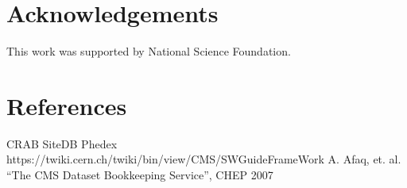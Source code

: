 \documentclass[a4paper]{jpconf}
\begin{document}


\section{Acknowledgements}

This work was supported by National Science Foundation.

\section*{References}
\begin{thebibliography}{9}
 CRAB
 SiteDB
 Phedex
 https://twiki.cern.ch/twiki/bin/view/CMS/SWGuideFrameWork
 A. Afaq, et. al. ``The CMS Dataset Bookkeeping Service'', CHEP 2007 

\end{thebibliography}
\end{document}

